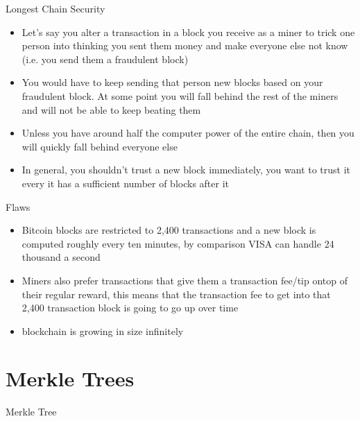\documentclass[handout]{beamer}
\renewcommand{\le}{5mm} %
\newcommand{\he}{8mm}   %
\newcommand{\hasharrow}[2]{ \draw (H#2.north) -- ($(H#2.north)+(0,.5*\he)$) -- ($(H#1.south)+(0,-.5*\he)$) -> (H#1.south); }
\begin{document}
\begin{frame}{Longest Chain Security}
    \begin{itemize}
        \item \pause Let's say you alter a transaction in a block you receive as a miner to trick one person into thinking you sent them money and make everyone else not know (i.e. you send them a fraudulent block) 
        \item \pause You would have to keep sending that person new blocks based on your fraudulent block. At some point you will fall behind the rest of the miners and will not be able to keep beating them
        \item \pause Unless you have around half the computer power of the entire chain, then you will quickly fall behind everyone else
        \item \pause In general, you shouldn't trust a new block immediately, you want to trust it every it has a sufficient number of blocks after it
    \end{itemize}
\end{frame}

\begin{frame}{Flaws}
    \begin{itemize}
        \item \pause Bitcoin blocks are restricted to 2,400 transactions and a new block is computed roughly every ten minutes, by comparison VISA can handle 24 thousand a second
        \item \pause Miners also prefer transactions that give them a transaction fee/tip ontop of their regular reward, this means that the transaction fee to get into that 2,400 transaction block is going to go up over time
        \item \pause blockchain is growing in size infinitely
    \end{itemize}
\end{frame}

\section{Merkle Trees}

\begin{frame}{Merkle Tree}
\end{frame}
\end{document}
